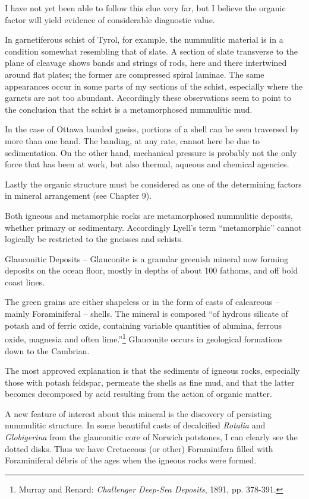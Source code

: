\documentclass[a4paper, 12pt, oneside]{article}
\begin{document}
I have not yet been able to follow this clue very far, but I believe the organic factor will yield evidence of considerable diagnostic value.

In garnetiferous schist of Tyrol, for example, the nummulitic material is in a condition somewhat resembling that of slate. A section of slate transverse to the plane of cleavage shows bands and strings of rods, here and there intertwined around flat plates; the former are compressed spiral laminae. The same appearances occur in some parts of my sections of the schist, especially where the garnets are not too abundant. Accordingly these observations seem to point to the conclusion that the schist is a metamorphosed nummulitic mud.

In the case of Ottawa banded gneiss, portions of a shell can be seen traversed by more than one band. The banding, at any rate, cannot here be due to sedimentation. On the other hand, mechanical pressure is probably not the only force that has been at work, but also thermal, aqueous and chemical agencies.

Lastly the organic structure must be considered as one of the determining factors in mineral arrangement (see Chapter 9).

Both igneous and metamorphic rocks are metamorphosed nummulitic deposits, whether primary or sedimentary. Accordingly Lyell's term ``metamorphic'' cannot logically be restricted to the gneisses and schists.

Glauconitic Deposits -- Glauconite is a granular greenish mineral now forming deposits on the ocean floor, mostly in depths of about 100 fathoms, and off bold coast lines.

The green grains are either shapeless or in the form of casts of calcareous -- mainly Foraminiferal -- shells. The mineral is composed ``of hydrous silicate of potash and of ferric oxide, containing variable quantities of alumina, ferrous oxide, magnesia and often lime.''\footnote{Murray and Renard: \emph{Challenger Deep-Sea Deposits}, 1891, pp. 378-391.} Glauconite occurs in geological formations down to the Cambrian.

The most approved explanation is that the sediments of igneous rocks, especially those with potash feldspar, permeate the shells as fine mud, and that the latter becomes decomposed by acid resulting from the action of organic matter.

A new feature of interest about this mineral is the discovery of persisting nummulitic structure. In some beautiful casts of decalcified \emph{Rotalia} and \emph{Globigerina} from the glauconitic core of Norwich potstones, I can clearly see the dotted disks. Thus we have Cretaceous (or other) Foraminifera filled with Foraminiferal débris of the ages when the igneous rocks were formed.
\end{document}
